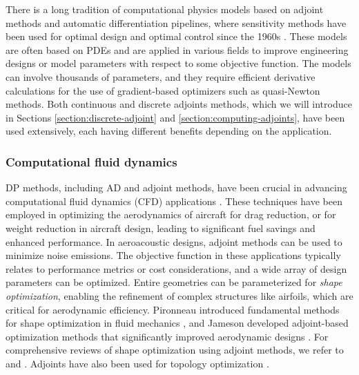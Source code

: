 There is a long tradition of computational physics models based on adjoint methods and automatic differentiation pipelines, where sensitivity methods have been used for optimal design and optimal control since the 1960s \cite{lions1971optimal}. 
These models are often based on PDEs and are applied in various fields to improve engineering designs or model parameters with respect to some objective function. 
The models can involve thousands of parameters, and they require efficient derivative calculations for the use of gradient-based optimizers such as quasi-Newton methods. 
Both continuous and discrete adjoints methods, which we will introduce in Sections \ref{section:discrete-adjoint} and \ref{section:computing-adjoints}, have been used extensively, each having different benefits depending on the application.

\subsubsection{Computational fluid dynamics}

DP methods, including AD and adjoint methods, have been crucial in advancing computational fluid dynamics (CFD) applications \cite{KENWAY2019100542}. 
These techniques have been employed in optimizing the aerodynamics of aircraft for drag reduction, or for weight reduction in aircraft design, leading to significant fuel savings and enhanced performance. 
In aeroacoustic designs, adjoint methods can be used to minimize noise emissions. 
The objective function in these applications typically relates to performance metrics or cost considerations, and a wide array of design parameters can be optimized.
Entire geometries can be parameterized for \emph{shape optimization}, enabling the refinement of complex structures like airfoils, which are critical for aerodynamic efficiency. 
Pironneau introduced fundamental methods for shape optimization in fluid mechanics \cite{Pironneau_1974}, and Jameson developed adjoint-based optimization methods that significantly improved aerodynamic designs \cite{Jameson_1988}. 
For comprehensive reviews of shape optimization using adjoint methods, we refer to \cite{Giles_Pierce_2000} and \cite{mohammadi2009applied}. 
Adjoints have also been used for topology optimization \cite{allaire2014shape}.

